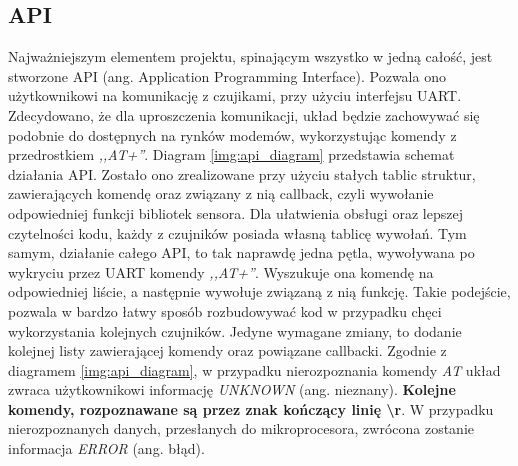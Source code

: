 \subsection{API}
\label{sub:api}
Najważniejszym elementem projektu, spinającym wszystko w jedną całość, jest stworzone API (ang. Application Programming Interface). Pozwala ono użytkownikowi na komunikację z czujikami, przy użyciu interfejsu UART. Zdecydowano, że dla uproszczenia komunikacji, układ będzie zachowywać się podobnie do dostępnych na rynków modemów, wykorzystując komendy z przedrostkiem \textit{,,AT+''}. Diagram \ref{img:api_diagram} przedstawia schemat działania API. Zostało ono zrealizowane przy użyciu stałych tablic struktur, zawierających komendę oraz związany z nią callback, czyli wywołanie odpowiedniej funkcji bibliotek sensora. Dla ułatwienia obsługi oraz lepszej czytelności kodu, każdy z czujników posiada własną tablicę wywołań. Tym samym, działanie całego API, to tak naprawdę jedna pętla, wywoływana po wykryciu przez UART komendy \textit{,,AT+''}. Wyszukuje ona komendę na odpowiedniej liście, a następnie wywołuje związaną z nią funkcję. Takie podejście, pozwala w bardzo łatwy sposób rozbudowywać kod w przypadku chęci wykorzystania kolejnych czujników. Jedyne wymagane zmiany, to dodanie kolejnej listy zawierającej komendy oraz powiązane callbacki. Zgodnie z diagramem \ref{img:api_diagram}, w przypadku nierozpoznania komendy \textit{AT} układ zwraca użytkownikowi informację \textit{UNKNOWN} (ang. nieznany). \textbf{Kolejne komendy, rozpoznawane są przez znak kończący linię \textbackslash r}. W przypadku nierozpoznanych danych, przesłanych do mikroprocesora, zwrócona zostanie informacja \textit{ERROR} (ang. błąd).

